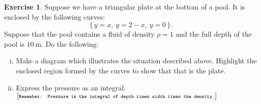 \documentclass[12pt]{article}
\theoremstyle{plain}
\theoremstyle{definition}
\newtheorem{Ej}[Th]{Exercise}         %
\theoremstyle{remark}
\renewcommand{\:}{\colon}           %
\renewcommand{\.}{\Cdot}                %
\newcommand{\set}[1]{\{\,#1\,\}}    %
\begin{document}

\begin{Ej}
  Suppose we have a triangular plate at the bottom of a pool. It is enclosed by the following curves:
  $$\set{y=x,\ y=2-x,\ y=0}.$$
  Suppose that the pool contains a fluid of density $\rho=1$ and the full depth of the pool is $10\ \si\metre$. Do the following:
  \begin{enumerate}[i)]
    \itemsep=-0.4em 
    \item Make a diagram which illustrates the situation described above. Highlight the enclosed region formed by the curves to show that that is the plate.
    \item Express the pressure as an integral. $\lbrack \scriptsize\texttt{Remember: Pressure is the integral of depth times width times the density.}\rbrack$
  \end{enumerate}
\end{Ej}
\end{document}
